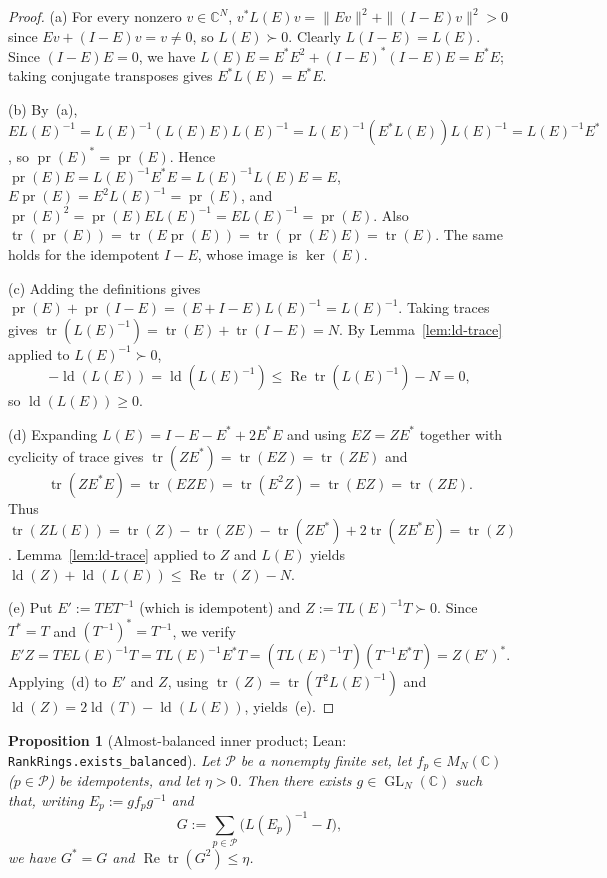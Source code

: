 \documentclass[11pt]{article}
\newtheorem{proposition}[theorem]{Proposition}
\theoremstyle{definition}
\theoremstyle{remark}
\numberwithin{equation}{section}
\DeclareMathOperator{\tr}{tr}
\DeclareMathOperator{\ld}{ld}
\DeclareMathOperator{\pr}{pr}
\DeclareMathOperator{\GL}{GL}
\DeclareMathOperator{\RePart}{Re}
\newcommand{\C}{\mathbb{C}}
\newcommand{\PP}{\mathcal{P}}
\newcommand{\1}{\mathbf{1}}
\newcommand{\code}[1]{{\normalfont\small\texttt{#1}}}
\begin{document}
\begin{proof}
(a) For every nonzero $v \in \C^N$, $v^* L(E) v = \|Ev\|^2 + \|(I - E)v\|^2 > 0$ since $Ev + (I - E)v = v \neq 0$, so $L(E) \succ 0$. Clearly $L(I - E) = L(E)$. Since $(I - E)E = 0$, we have $L(E)E = E^*E^2 + (I-E)^*(I-E)E = E^*E$; taking conjugate transposes gives $E^* L(E) = E^* E$.

(b) By~(a), $E L(E)^{-1} = L(E)^{-1}(L(E)E)L(E)^{-1} = L(E)^{-1}(E^* L(E))L(E)^{-1} = L(E)^{-1}E^*$, so $\pr(E)^* = \pr(E)$. Hence $\pr(E)E = L(E)^{-1}E^*E = L(E)^{-1}L(E)E = E$, $E\pr(E) = E^2 L(E)^{-1} = \pr(E)$, and $\pr(E)^2 = \pr(E) E L(E)^{-1} = E L(E)^{-1} = \pr(E)$. Also $\tr(\pr(E)) = \tr(E\pr(E)) = \tr(\pr(E)E) = \tr(E)$. The same holds for the idempotent $I - E$, whose image is $\ker(E)$.

(c) Adding the definitions gives $\pr(E) + \pr(I - E) = (E + I - E)L(E)^{-1} = L(E)^{-1}$. Taking traces gives $\tr(L(E)^{-1}) = \tr(E) + \tr(I - E) = N$. By Lemma~\ref{lem:ld-trace} applied to $L(E)^{-1} \succ 0$,
\[
-\ld(L(E)) = \ld(L(E)^{-1}) \le \RePart\tr(L(E)^{-1}) - N = 0,
\]
so $\ld(L(E)) \ge 0$.

(d) Expanding $L(E) = I - E - E^* + 2E^*E$ and using $EZ = ZE^*$ together with cyclicity of trace gives $\tr(ZE^*) = \tr(EZ) = \tr(ZE)$ and
\[
\tr(Z E^* E) = \tr(E Z E) = \tr(E^2 Z) = \tr(EZ) = \tr(ZE).
\]
Thus $\tr(Z L(E)) = \tr(Z) - \tr(ZE) - \tr(ZE^*) + 2\tr(ZE^*E) = \tr(Z)$. Lemma~\ref{lem:ld-trace} applied to $Z$ and $L(E)$ yields $\ld(Z) + \ld(L(E)) \le \RePart\tr(Z) - N$.

(e) Put $E' := T E T^{-1}$ (which is idempotent) and $Z := T L(E)^{-1} T \succ 0$. Since $T^* = T$ and $(T^{-1})^* = T^{-1}$, we verify
\[
E' Z = T E L(E)^{-1} T = T L(E)^{-1} E^* T = (T L(E)^{-1} T)(T^{-1} E^* T) = Z (E')^*.
\]
Applying~(d) to $E'$ and $Z$, using $\tr(Z) = \tr(T^2 L(E)^{-1})$ and $\ld(Z) = 2\ld(T) - \ld(L(E))$, yields~(e).
\end{proof}

\begin{proposition}[Almost-balanced inner product; Lean: \code{RankRings.exists\_balanced}]
\label{prop:balanced}
Let $\PP$ be a nonempty finite set, let $f_p \in M_N(\C)$ ($p \in \PP$) be idempotents, and let $\eta > 0$. Then there exists $g \in \GL_N(\C)$ such that, writing $E_p := g f_p g^{-1}$ and
\[
G := \sum_{p \in \PP} \bigl(L(E_p)^{-1} - I\bigr),
\]
we have $G^* = G$ and $\RePart\tr(G^2) \le \eta$.
\end{proposition}
\end{document}
